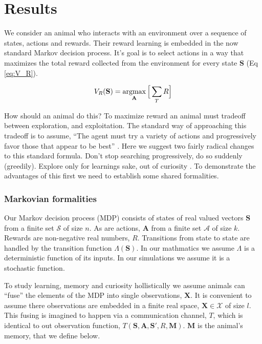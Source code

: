 \section{Results} 
We consider an animal who interacts with an environment over a sequence of states, actions and rewards. Their reward learning is embedded in the now standard Markov decision process. It's goal is to select actions in a way that maximizes the total reward collected from the environment for every state $\mathbf{S}$ (Eq \ref{eq:V_R}).

\begin{equation}
	\label{eq:V_R}
	V_R(\mathbf{S}) = \operatorname*{argmax}_{\mathbf{A}} \Big [ \sum_T R \Big ]
\end{equation}

How should an animal do this? To maximize reward an animal must tradeoff between exploration, and exploitation. The standard way of approaching this tradeoff is to assume, ``The agent must try a variety of actions and progressively favor those that appear to be best'' \cite{Sutton2018}. Here we suggest two fairly radical changes to this standard formula. Don’t stop searching progressively, do so suddenly (greedily). Explore only for learnings sake, out of curiosity \citep{Kidd2015}. To demonstrate the advantages of this first we need to establish some shared formalities.

\subsubsection{Markovian formalities}
Our Markov decision process (MDP) consists of states of real valued vectors $\mathbf{S}$ from a finite set $\mathcal{S}$ of size $n$. As are actions, $\mathbf{A}$ from a finite set $\mathcal{A}$ of size $k$. Rewards are non-negative real numbers, $R$. Transitions from state to state are handled by the transition function $\Lambda(\mathbf{S})$. In our mathmatics we assume $\Lambda$ is a deterministic function of its inputs. In our simulations we assume it is a stochastic function.

To study learning, memory and curiosity hollistically we assume animals can ``fuse'' the elements of the MDP into single observations, $\mathbf{X}$.  It is convenient to assume there observations are embedded in a finite real space, $\mathbf{X} \in \mathcal{X}$ of size $l$. This fusing is imagined to happen via a communication channel, $T$, which is identical to out observation function, $T(\mathbf{S},\mathbf{A},\mathbf{S'},R,\mathbf{M})$. $\mathbf{M}$ is the animal's memory, that we define below. 

